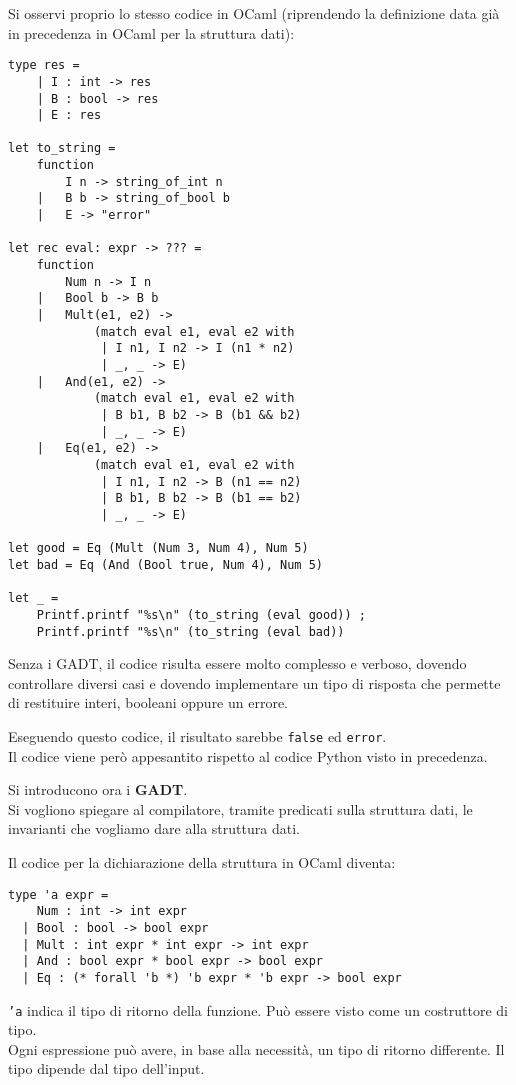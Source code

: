 \documentclass{article}
\begin{document}
Si osservi proprio lo stesso codice in OCaml (riprendendo la definizione data già in precedenza in OCaml per la struttura dati):
\begin{tcolorbox}
\begin{verbatim}
type res = 
    | I : int -> res
    | B : bool -> res
    | E : res

let to_string =
    function
        I n -> string_of_int n
    |   B b -> string_of_bool b
    |   E -> "error"

let rec eval: expr -> ??? =
    function
        Num n -> I n
    |   Bool b -> B b
    |   Mult(e1, e2) ->
            (match eval e1, eval e2 with
             | I n1, I n2 -> I (n1 * n2)
             | _, _ -> E)
    |   And(e1, e2) ->
            (match eval e1, eval e2 with
             | B b1, B b2 -> B (b1 && b2)
             | _, _ -> E)
    |   Eq(e1, e2) ->
            (match eval e1, eval e2 with
             | I n1, I n2 -> B (n1 == n2)
             | B b1, B b2 -> B (b1 == b2)
             | _, _ -> E)

let good = Eq (Mult (Num 3, Num 4), Num 5)
let bad = Eq (And (Bool true, Num 4), Num 5)

let _ = 
    Printf.printf "%s\n" (to_string (eval good)) ;
    Printf.printf "%s\n" (to_string (eval bad))
\end{verbatim}
\end{tcolorbox}
Senza i GADT, il codice risulta essere molto complesso e verboso, dovendo controllare diversi casi e dovendo implementare un tipo di risposta che permette di restituire interi, booleani oppure un errore.

Eseguendo questo codice, il risultato sarebbe \texttt{false} ed \texttt{error}.\\
Il codice viene però appesantito rispetto al codice Python visto in precedenza.

\pagebreak

Si introducono ora i \textbf{GADT}.\\
Si vogliono spiegare al compilatore, tramite predicati sulla struttura dati, le invarianti che vogliamo dare alla struttura dati.

Il codice per la dichiarazione della struttura in OCaml diventa:
\begin{tcolorbox}
\begin{verbatim}
type 'a expr =
    Num : int -> int expr
  | Bool : bool -> bool expr
  | Mult : int expr * int expr -> int expr
  | And : bool expr * bool expr -> bool expr
  | Eq : (* forall 'b *) 'b expr * 'b expr -> bool expr
\end{verbatim}
\end{tcolorbox}
\texttt{'a} indica il tipo di ritorno della funzione. Può essere visto come un costruttore di tipo.\\
Ogni espressione può avere, in base alla necessità, un tipo di ritorno differente. Il tipo dipende dal tipo dell'input.
\end{document}
